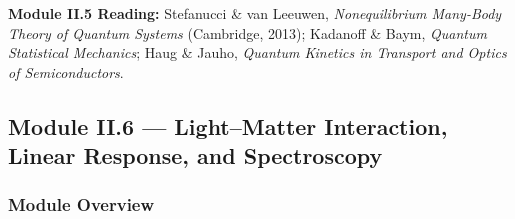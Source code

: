 \documentclass[11pt,a4paper]{article}
\begin{document}
\begin{tcolorbox}[highlightbox]
\textbf{Module II.5 Reading:} Stefanucci \& van Leeuwen, \textit{Nonequilibrium Many-Body Theory of Quantum Systems} (Cambridge, 2013); Kadanoff \& Baym, \textit{Quantum Statistical Mechanics}; Haug \& Jauho, \textit{Quantum Kinetics in Transport and Optics of Semiconductors}.
\end{tcolorbox}

\subsection{Module II.6 --- Light--Matter Interaction, Linear Response, and Spectroscopy}
\label{sec:mod-II6}

\subsubsection*{Module Overview}
\end{document}
